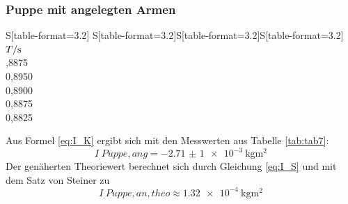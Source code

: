 \subsubsection{Puppe mit angelegten Armen}
\begin{table}
	\centering
	\caption{Messdaten zur Periodendauer einer Puppe mit angelegten Armen}
	\begin{tabular}{S[table-format=3.2] S[table-format=3.2]S[table-format=3.2]S[table-format=3.2]}
		\toprule
		{$T/\si[per-mode=reciprocal]{\second}$} \\
		,8875 \\
		 0,8950 \\
		 0,8900 \\
		 0,8875 \\
		 0,8825 \\
		\bottomrule
	\end{tabular}
	\label{tab:tab7}
\end{table}
\noindent Aus Formel \eqref{eq:I_K} ergibt sich mit den Messwerten aus Tabelle \ref{tab:tab7}:
\[I_.{Puppe,ang}=\SI{-2,71(1)e-3}{\kilogram\metre\squared}\]
Der genäherten Theoriewert berechnet sich durch Gleichung \eqref{eq:I_S} und mit dem Satz von Steiner zu
\[I_.{Puppe,an,theo} \approx \SI{1,32e-4}{\kilogram\metre\squared} \]